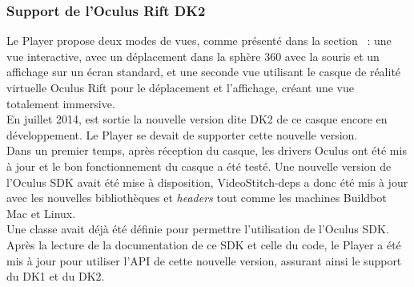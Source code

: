 \subsubsection{Support de l'Oculus Rift DK2}
Le Player propose deux modes de vues, comme présenté dans la section ~:
une vue interactive, avec un déplacement dans la sphère 360 avec la souris et un affichage
sur un écran standard, et une seconde vue utilisant le casque de réalité virtuelle 
Oculus Rift pour le déplacement et l'affichage, créant une vue totalement immersive.\\
En juillet 2014\cite{dk2s-now-shipping}, est sortie la nouvelle version dite DK2 de ce casque encore
en développement. Le Player se devait de supporter cette nouvelle version.\\
Dans un premier temps, après réception du casque, les drivers Oculus ont été mis à
jour et le bon fonctionnement du casque a été testé. Une nouvelle version de l'Oculus
SDK avait été mise à disposition, VideoStitch-deps a donc été mis à jour avec les nouvelles
bibliothèques et \textit{headers} tout comme les machines Buildbot Mac et Linux.\\
\newline
Une classe  avait déjà été définie pour permettre l'utilisation
de l'Oculus SDK. Après la lecture de la documentation de ce SDK et celle du code,
le Player a été mis à jour pour utiliser l'API de cette nouvelle version, assurant
ainsi le support du DK1 et du DK2.

